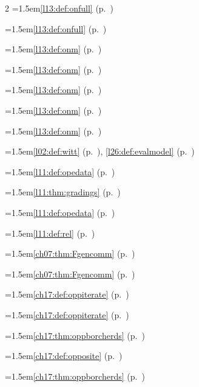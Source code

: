 \begin{multicols}{2}
\hangindent=1.5em\quad \ref{l13:def:onfull} (p.~\pageref{l13:def:onfull})\par
\hangindent=1.5em\quad \ref{l13:def:onfull} (p.~\pageref{l13:def:onfull})\par
\hangindent=1.5em\quad \ref{l13:def:onm} (p.~\pageref{l13:def:onm})\par
\hangindent=1.5em\quad \ref{l13:def:onm} (p.~\pageref{l13:def:onm})\par
\hangindent=1.5em\quad \ref{l13:def:onm} (p.~\pageref{l13:def:onm})\par
\hangindent=1.5em\quad \ref{l13:def:onm} (p.~\pageref{l13:def:onm})\par
\hangindent=1.5em\quad \ref{l13:def:onm} (p.~\pageref{l13:def:onm})\par
\hangindent=1.5em\quad \ref{l02:def:witt} (p.~\pageref{l02:def:witt}), \ref{l26:def:evalmodel} (p.~\pageref{l26:def:evalmodel})\par
\hangindent=1.5em\quad \ref{l11:def:opedata} (p.~\pageref{l11:def:opedata})\par
\hangindent=1.5em\quad \ref{l11:thm:gradings} (p.~\pageref{l11:thm:gradings})\par
\hangindent=1.5em\quad \ref{l11:def:opedata} (p.~\pageref{l11:def:opedata})\par
\hangindent=1.5em\quad \ref{l11:def:rel} (p.~\pageref{l11:def:rel})\par
\hangindent=1.5em\quad \ref{ch07:thm:Fgencomm} (p.~\pageref{ch07:thm:Fgencomm})\par
\hangindent=1.5em\quad \ref{ch07:thm:Fgencomm} (p.~\pageref{ch07:thm:Fgencomm})\par
\hangindent=1.5em\quad \ref{ch17:def:oppiterate} (p.~\pageref{ch17:def:oppiterate})\par
\hangindent=1.5em\quad \ref{ch17:def:oppiterate} (p.~\pageref{ch17:def:oppiterate})\par
\hangindent=1.5em\quad \ref{ch17:thm:oppborcherds} (p.~\pageref{ch17:thm:oppborcherds})\par
\hangindent=1.5em\quad \ref{ch17:def:opposite} (p.~\pageref{ch17:def:opposite})\par
\hangindent=1.5em\quad \ref{ch17:thm:oppborcherds} (p.~\pageref{ch17:thm:oppborcherds})\par

\end{multicols}
